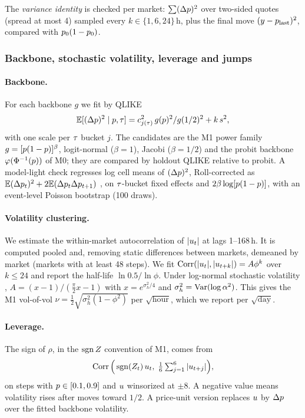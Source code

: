 The \emph{variance identity} is checked per market: $\sum(\Delta p)^2$ over two-sided quotes
(spread at most 4\cents) sampled every $k\in\{1,6,24\}$\,h, plus the final move
$(y-p_{\text{last}})^2$, compared with $p_0(1-p_0)$.

\subsubsection{Backbone, stochastic volatility, leverage and jumps}\label{sec:dyn-sv}

\paragraph{Backbone.}
For each backbone $g$ we fit by QLIKE
\begin{equation}\label{eq:dyn-backbone}
\mathbb{E}[(\Delta p)^2\mid p,\tau]=c_{j(\tau)}^2\,g(p)^2/g(1/2)^2+k\,s^2,
\end{equation}
with one scale per $\tau$ bucket $j$. The candidates are the M1 power family
$g=[p(1-p)]^\beta$, logit-normal ($\beta=1$), Jacobi ($\beta=1/2$) and the probit backbone
$\varphi(\Phi^{-1}(p))$ of M0; they are compared by holdout QLIKE relative to probit. A model-light
check regresses log cell means of $(\Delta p)^2$, Roll-corrected as
$\mathbb{E}(\Delta p_t)^2+2\mathbb{E}(\Delta p_t\Delta p_{t+1})$ \citep{roll1984}, on $\tau$-bucket fixed
effects and $2\beta\log[p(1-p)]$, with an event-level Poisson bootstrap (100 draws).

\paragraph{Volatility clustering.}
We estimate the within-market autocorrelation of $|u_t|$ at lags 1--168\,h. It is computed
pooled and, removing static differences between markets, demeaned by market (markets with at least
48 steps). We fit $\operatorname{Corr}(|u_t|,|u_{t+k}|)=A\phi^k$ over $k\le24$ and report the half-life
$\ln0.5/\ln\phi$. Under log-normal stochastic volatility \citep{taylor1986},
$A=(x-1)/(\tfrac{\pi}{2}x-1)$ with $x=e^{\sigma_h^2/4}$ and $\sigma_h^2=\operatorname{Var}(\log\alpha^2)$. This
gives the M1 vol-of-vol $\nu=\tfrac12\sqrt{\sigma_h^2(1-\phi^2)}$ per $\sqrt{\text{hour}}$, which we
report per $\sqrt{\text{day}}$.

\paragraph{Leverage.}
The sign of $\rho$, in the $\operatorname{sgn}Z$ convention of M1, comes from
\begin{equation}\label{eq:dyn-lev}
\operatorname{Corr}\Big(\operatorname{sgn}(Z_t)\,u_t,\;\tfrac16\textstyle\sum_{j=1}^{6}|u_{t+j}|\Big),
\end{equation}
on steps with $p\in[0.1,0.9]$ and $u$ winsorized at $\pm8$. A negative value means volatility
rises after moves toward $1/2$. A price-unit version replaces $u$ by $\Delta p$ over the fitted
backbone volatility.

